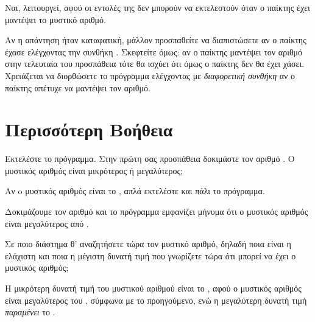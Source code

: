 \documentclass[a4paper,11pt,oneside]{book}
\begin{document}
\begin{step}
\begin{answer}
	Ναι, λειτουργεί, αφού οι εντολές της  δεν μπορούν να εκτελεστούν όταν ο παίκτης έχει μαντέψει το μυστικό αριθμό.
\end{answer}


Αν η απάντηση ήταν καταφατική, μάλλον προσπαθείτε να διαπιστώσετε αν ο παίκτης έχασε ελέγχοντας την συνθήκη . Σκεφτείτε όμως: αν ο παίκτης μαντέψει τον αριθμό στην τελευταία του προσπάθεια τότε θα ισχύει ότι  όμως ο παίκτης δεν θα έχει χάσει. Χρειάζεται να διορθώσετε το πρόγραμμα ελέγχοντας με \emph{διαφορετική συνθήκη} αν ο παίκτης απέτυχε να μαντέψει τον αριθμό.
\end{step}

\section{Περισσότερη Βοήθεια}

\begin{step}
Εκτελέστε το πρόγραμμα. Στην πρώτη σας προσπάθεια δοκιμάστε τον αριθμό . Ο μυστικός αριθμός είναι μικρότερος ή μεγαλύτερος;

\begin{note}
Αν o μυστικός αριθμός είναι το , απλά εκτελέστε και πάλι το πρόγραμμα.
\end{note}

\begin{answer}
	Δοκιμάζουμε τον αριθμό  και το πρόγραμμα εμφανίζει μήνυμα ότι ο μυστικός αριθμός είναι μεγαλύτερος από .
\end{answer}

Σε ποιο διάστημα θ' αναζητήσετε τώρα τον μυστικό αριθμό, δηλαδή 
ποια είναι η ελάχιστη και ποια η μέγιστη δυνατή τιμή που γνωρίζετε τώρα ότι μπορεί να έχει ο μυστικός αριθμός;

\begin{answer}
	Η μικρότερη δυνατή τιμή του μυστικού αριθμού είναι το , αφού ο μυστικός αριθμός είναι μεγαλύτερος του , σύμφωνα με το προηγούμενο, ενώ η μεγαλύτερη δυνατή τιμή \emph{παραμένει} το .
\end{answer}
\end{step}
\end{document}
